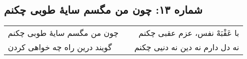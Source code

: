 \begin{center}
\section*{شماره ۱۳: چون من مگسم سایۀ طوبی چکنم}
\label{sec:013}
\begin{longtable}{l p{0.5cm} r}
چون من مگسم سایهٔ طوبی چکنم
&&
با عَقْبَهْ نفس، عزم عقبی چکنم
\\
گویند درین راه چه خواهی کردن
&&
نه دل دارم نه دین نه دنیی چکنم
\\
\end{longtable}
\end{center}
